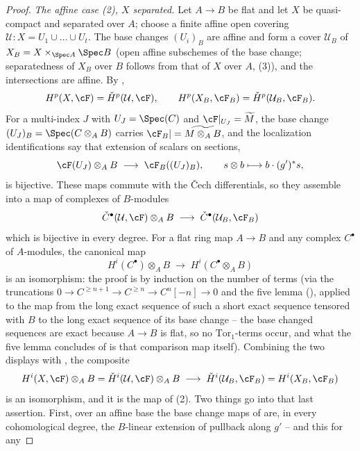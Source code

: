 \begin{proof}
\emph{The affine case (2), $X$ separated.}  Let $A\to B$ be flat and let
$X$ be quasi-compact and separated over $A$; choose a finite affine
open covering $\mathcal U:X=U_1\cup\dots\cup U_t$.  The base changes
$(U_i)_B$ are affine and form a cover $\mathcal U_B$ of
$X_B=X\times_{\Spec A}\Spec B$ (open affine subschemes of the base
change; separatedness of $X_B$ over $B$ follows from that of $X$ over $A$,
(3)), and the
intersections are affine.  By ,
\[
H^p(X,\cF)=\check H^p(\mathcal U,\cF),\qquad
H^p(X_B,\cF_B)=\check H^p(\mathcal U_B,\cF_B).
\]
For a multi-index $J$ with $U_J=\Spec(C)$ and $\cF|_{U_J}=\widetilde M$,
the base change $(U_J)_B=\Spec(C\otimes_AB)$ carries
$\cF_B|=\widetilde{M\otimes_AB}$, and the localization identifications
say that extension of scalars on sections,
\[
\cF(U_J)\otimes_AB\;\longrightarrow\;\cF_B((U_J)_B),\qquad
s\otimes b\longmapsto b\cdot(g')^*s ,
\]
is bijective.  These maps commute with the Čech differentials, so they
assemble into a map of complexes of $B$-modules
\[
\check C^\bullet(\mathcal U,\cF)\otimes_AB
\;\longrightarrow\;\check C^\bullet(\mathcal U_B,\cF_B)
\]
which is bijective in every degree.
For a flat ring map $A\to B$ and any complex $C^\bullet$ of
$A$-modules, the canonical map
\[
H^i(C^\bullet)\otimes_AB\;\longrightarrow\;H^i(C^\bullet\otimes_AB)
\]
is an isomorphism: the proof is by induction on the number of terms
(via the truncations $0\to C^{\ge n+1}\to C^{\ge n}\to C^n[-n]\to0$ and
the five lemma (), applied to the map from the
long exact sequence of such a short exact sequence tensored with $B$ to
the long exact sequence of its base change -- the base changed
sequences are exact because $A\to B$ is flat, so no
$\mathrm{Tor}_1$-terms occur, and what the five lemma concludes of is
that comparison map itself).  Combining the two displays with
, the composite
\[
H^i(X,\cF)\otimes_AB=\check H^i(\mathcal U,\cF)\otimes_AB
\;\longrightarrow\;\check H^i(\mathcal U_B,\cF_B)=H^i(X_B,\cF_B)
\]
is an isomorphism, and it is the map of (2).  Two things go into that
last assertion.  First, over an affine base the base change maps of
 are, in every cohomological degree, the
$B$-linear extension of pullback along $g'$ -- and this for any

\end{proof}
